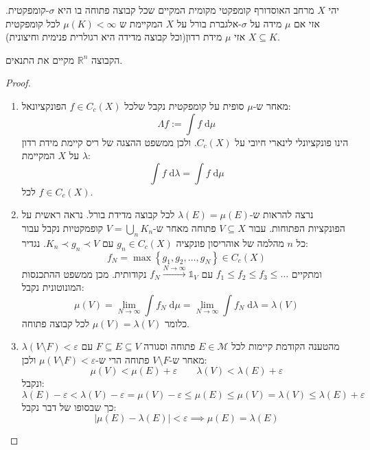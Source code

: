 \documentclass{tstextbook}
\begin{document}
\begin{proposition}
יהי \(X\) מרחב האוסדורף קומפקטי מקומית המקיים שכל קבוצה פתוחה בו היא \(\sigma\)-קומפקטית. אזי אם \(\mu\) מידה על \(\sigma\)-אלגברת בורל על \(X\) המקיימת ש \(\mu(K)<\infty\) לכל קומפקטית \(X \subseteq K\) אזי \(\mu\) מידת רדון(וכל קבוצה מדידה היא רגולרית פנימית וחיצונית).

\end{proposition}
\begin{example}
הקבוצה \(\mathbb{R}^{n}\) מקיים את התנאים. 

\end{example}
\begin{proof}
  \begin{enumerate}
    \item מאחר ש-\(\mu\) סופית על קומפקטית נקבל שלכל \(f\in C_{c}(X)\) הפונקציונאל: 
$$\Lambda f:= \int f \;\mathrm{d} \mu $$
הינו פונקציונלי לינארי חיובי על \(C_{c}(X)\). ולכן ממשפט ההצגה של ריס קיימת מידת רדון \(\lambda\) על \(X\) המקיימת:
$$\int f \;\mathrm{d} \lambda = \int f \;\mathrm{d} \mu  $$
לכל \(f \in C_{c}(X)\). 


    \item נרצה להראות ש-\(\lambda(E)=\mu(E)\) לכל קבוצה מדידת בורל. נראה ראשית על הפונקציות הפתוחות. עבור \(V\subseteq X\) פתוחה מאחר ש-\(V= \bigcup_{n}K_{n}\) קופמקטיות נקבל עבור כל \(n\) מהלמה של אוהריסון פונקציה \(g_{n}\in C_{c}(X)\)  עם \(K_{n}\prec g_{n}\prec V\). נגדיר: 
$$f_{N}=\max \left\{  g_{1},g_{2},\dots, g_{N}  \right\} \in C_{c}(X)$$
ומתקיים \(f_{1}\leq f_{2}\leq f_{3}\leq\dots\) עם \(f_{N}\xrightarrow{N\to \infty} \mathbb{1}_{V}\) נקודותית. מכן ממשפט ההתכנסות המונוטונית נקבל:
$$\mu(V)=\lim_{ N \to \infty } \int f_{N} \;\mathrm{d} \mu =\lim_{ N \to \infty } \int f_{N} \;\mathrm{d} \lambda = \lambda(V) $$
כלומר \(\mu(V)=\lambda(V)\) לכל קבוצה פתוחה. 


    \item מהטענה הקודמת קיימות לכל \(E\in \mathcal{M}\) פתוחה וסגורה \(F\subseteq E \subseteq V\) עם \(\lambda\left( V\setminus F \right)<\varepsilon\) מאחר ש-\(V\setminus F\) פתוחה הרי ש-\(\mu\left( V\setminus F \right)<\varepsilon\) ולכן: 
$$\mu(V)<\mu(E)+\varepsilon \qquad \lambda(V)<\lambda(E)+\varepsilon$$
ונקבל:
$$\lambda(E)-\varepsilon<\lambda(V)-\varepsilon = \mu(V)-\varepsilon \leq \mu(E)\leq \mu(V)=\lambda(V)\leq \lambda(E)+\varepsilon$$
כך שבסופו של דבר נקבל:
$$\left\lvert  \mu(E)-\lambda(E)  \right\rvert <\varepsilon\implies \mu(E)=\lambda(E)$$


  \end{enumerate}
\end{proof}
\end{document}
